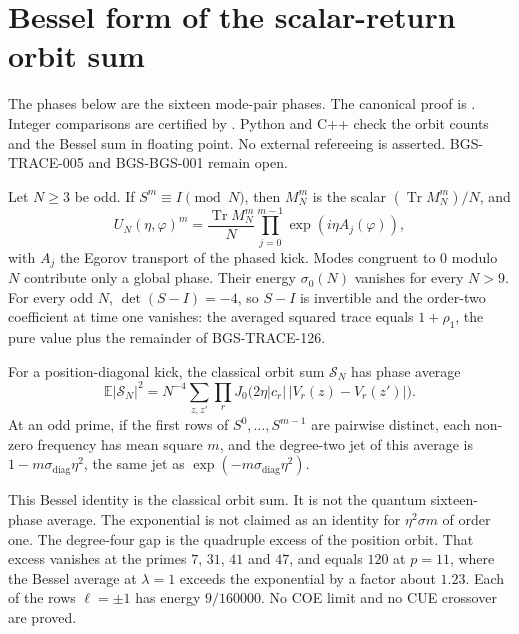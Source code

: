 \section{Bessel form of the scalar-return orbit sum}
\label{sec:scalar-return-bessel}
The phases below are the sixteen mode-pair phases. The canonical proof is
.
Integer comparisons are certified by
.
Python and C++ check the orbit counts and the Bessel sum in floating point.
No external refereeing is asserted.
BGS-TRACE-005 and BGS-BGS-001 remain open.


\begin{theorem}
\label{thm:scalar-return-bessel}
Let \(N\ge 3\) be odd. If \(S^m\equiv I\pmod N\), then \(M_N^m\) is the scalar
\((\operatorname{Tr} M_N^m)/N\), and
\[
U_N(\eta,\varphi)^m
=\frac{\operatorname{Tr} M_N^m}{N}
\prod_{j=0}^{m-1}\exp(i\eta A_j(\varphi)),
\]
with \(A_j\) the Egorov transport of the phased kick. Modes congruent to \(0\)
modulo \(N\) contribute only a global phase. Their energy \(\sigma_0(N)\)
vanishes for every \(N>9\). For every odd \(N\), \(\det(S-I)=-4\), so
\(S-I\) is invertible and the order-two coefficient at time one vanishes:
the averaged squared trace equals \(1+\rho_1\), the pure value plus the remainder of BGS-TRACE-126.

For a position-diagonal kick, the classical orbit sum
\(\mathcal S_N\) has phase average
\[
\mathbb E\lvert\mathcal S_N\rvert^2
=N^{-4}\sum_{z,z'}\prod_r
J_0\bigl(2\eta\lvert c_r\rvert\,\lvert V_r(z)-V_r(z')\rvert\bigr).
\]
At an odd prime, if the first rows of \(S^0,\ldots,S^{m-1}\) are pairwise
distinct, each non-zero frequency has mean square \(m\), and the degree-two
jet of this average is \(1-m\sigma_{\mathrm{diag}}\eta^2\), the same jet as
\(\exp(-m\sigma_{\mathrm{diag}}\eta^2)\).

This Bessel identity is the classical orbit sum. It is not the quantum
sixteen-phase average. The exponential is not claimed as an identity for
\(\eta^2\sigma m\) of order one. The degree-four gap is the quadruple excess
of the position orbit. That excess vanishes at the primes \(7\), \(31\), \(41\)
and \(47\), and equals \(120\) at \(p=11\), where the Bessel average at
\(\lambda=1\) exceeds the exponential by a factor about \(1.23\). Each of
the rows \(\ell=\pm 1\) has energy \(9/160000\). No COE limit and no CUE
crossover are proved.
\end{theorem}
